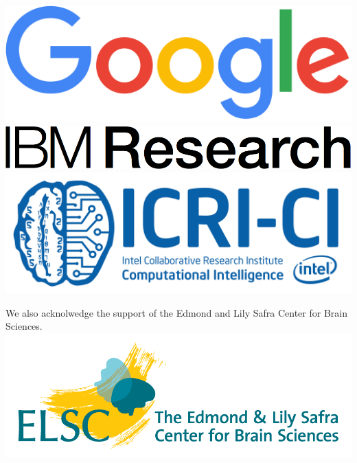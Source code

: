 \documentclass[a0,portrait]{a0poster}
\begin{document}
\includegraphics{img/google_logo.png}\\
\includegraphics{img/ibmresearch_logo.png}\\
\includegraphics{img/icrici_logo.png}

We also acknolwedge the support of the Edmond and Lily Safra Center for
Brain Sciences. \includegraphics{img/elsc_logo.png}
\end{document}
